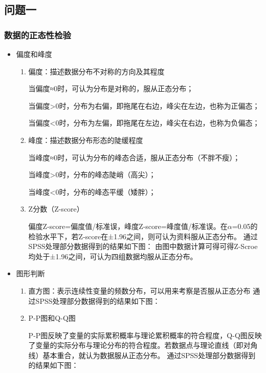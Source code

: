 \documentclass[UTF8]{ctexart}
\begin{document}
	\subsection{问题一}
	\subsubsection{数据的正态性检验}
	\begin{itemize}
		\item 偏度和峰度
		\begin{enumerate}
			\item 偏度：描述数据分布不对称的方向及其程度
			
			当偏度≈0时，可认为分布是对称的，服从正态分布；
			
			当偏度>0时，分布为右偏，即拖尾在右边，峰尖在左边，也称为正偏态；
			
			当偏度<0时，分布为左偏，即拖尾在左边，峰尖在右边，也称为负偏态；
			
			\item 峰度：描述数据分布形态的陡缓程度
			
			当峰度≈0时，可认为分布的峰态合适，服从正态分布（不胖不瘦）；
			
			当峰度>0时，分布的峰态陡峭（高尖）；
			
			当峰度<0时，分布的峰态平缓（矮胖）；
			
			\item Z分数（Z-score） 
			
			偏度Z-score=偏度值/标准误，峰度Z-score=峰度值/标准误。在$\alpha$=0.05的检验水平下，若Z-score在±1.96之间，则可认为资料服从正态分布。
			通过SPSS处理部分数据得到的结果如下图：	
		由图中数据计算可得可得Z-Scroe均处于±1.96之间，可认为四组数据均服从正态分布。			
		\end{enumerate}
		\item 图形判断
		\begin{enumerate}
			\item 直方图：表示连续性变量的频数分布，可以用来考察是否服从正态分布
			通过SPSS处理部分数据得到的结果如下图：
			\item P-P图和Q-Q图
			
			P-P图反映了变量的实际累积概率与理论累积概率的符合程度，Q-Q图反映了变量的实际分布与理论分布的符合程度。若数据点与理论直线（即对角线）基本重合，就认为数据服从正态分布。
			通过SPSS处理部分数据得到的结果如下图：
			
		\end{enumerate}
	\end{itemize}
\end{document}
